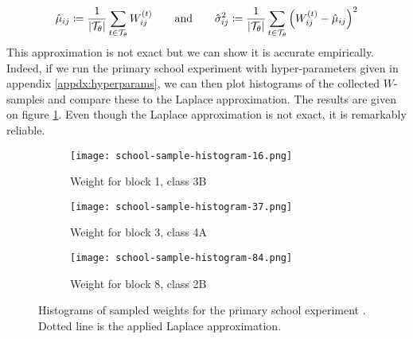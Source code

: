 %
\begin{equation}
	\hat{\mu}_{ij} \coloneqq \frac{1}{|\mathcal{T}_\theta|} \sum_{t \in \mathcal{T}_\theta} W_{ij}^{(t)} \qquad \textrm{and} \qquad
	\hat{\sigma}_{ij}^2 \coloneqq \frac{1}{|\mathcal{T}_\theta|} \sum_{t \in \mathcal{T}_\theta} \left( W_{ij}^{(t)} - \hat{\mu}_{ij} \right)^2
\end{equation}
%
This approximation is not exact but we can show it is accurate empirically. Indeed, if we run the primary school experiment with hyper-parameters given in appendix \ref{appdx:hyperparams}, we can then plot histograms of the collected $W$-samples and compare these to the Laplace approximation. The results are given on figure \ref{fig:school-histogram}. Even though the Laplace approximation is not exact, it is remarkably reliable. 

\begin{figure}[!h]
	\centering
	\begin{subfigure}[t]{0.3\linewidth}
		\centering
		\texttt{[image: school-sample-histogram-16.png]}
		\caption{Weight for block 1, class 3B}
	\end{subfigure}
	\hfill
	\begin{subfigure}[t]{0.3\linewidth}
		\centering
		\texttt{[image: school-sample-histogram-37.png]}
		\caption{Weight for block 3, class 4A}
	\end{subfigure}
	\hfill
	\begin{subfigure}[t]{0.3\linewidth}
		\centering
		\texttt{[image: school-sample-histogram-84.png]}
		\caption{Weight for block 8, class 2B}
	\end{subfigure}

	\caption{Histograms of sampled weights for the primary school experiment \cite{schools}. Dotted line is the applied Laplace approximation.}
	\label{fig:school-histogram}
\end{figure}

